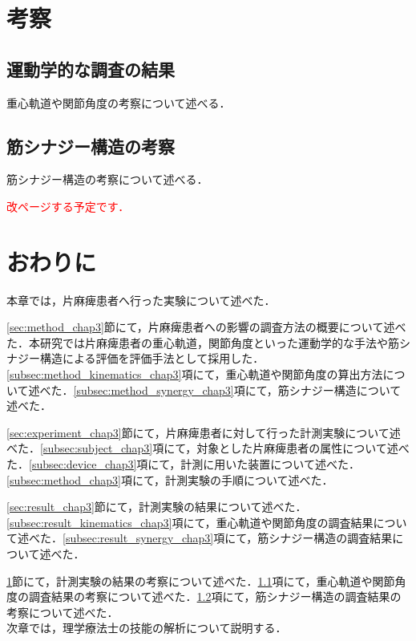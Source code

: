 \section{考察}
\label{sec:discussion_chap3}

\subsection{運動学的な調査の結果}
\label{subsec:discussion_kinematics_chap3}
重心軌道や関節角度の考察について述べる．

\subsection{筋シナジー構造の考察}
\label{subsec:discussion_synergy_chap3}
筋シナジー構造の考察について述べる．

\textcolor{red}{改ページする予定です．}
\section{おわりに}
\label{sec:outro_chap3}
本章では，片麻痺患者へ行った実験について述べた．

\ref{sec:method_chap3}節にて，片麻痺患者への影響の調査方法の概要について述べた．本研究では片麻痺患者の重心軌道，関節角度といった運動学的な手法や筋シナジー構造による評価を評価手法として採用した．\ref{subsec:method_kinematics_chap3}項にて，重心軌道や関節角度の算出方法について述べた．\ref{subsec:method_synergy_chap3}項にて，筋シナジー構造について述べた．

\ref{sec:experiment_chap3}節にて，片麻痺患者に対して行った計測実験について述べた．\ref{subsec:subject_chap3}項にて，対象とした片麻痺患者の属性について述べた．\ref{subsec:device_chap3}項にて，計測に用いた装置について述べた．\ref{subsec:method_chap3}項にて，計測実験の手順について述べた．

\ref{sec:result_chap3}節にて，計測実験の結果について述べた．\ref{subsec:result_kinematics_chap3}項にて，重心軌道や関節角度の調査結果について述べた．\ref{subsec:result_synergy_chap3}項にて，筋シナジー構造の調査結果について述べた．

\ref{sec:discussion_chap3}節にて，計測実験の結果の考察について述べた．\ref{subsec:discussion_kinematics_chap3}項にて，重心軌道や関節角度の調査結果の考察について述べた．\ref{subsec:discussion_synergy_chap3}項にて，筋シナジー構造の調査結果の考察について述べた．\\

次章では，理学療法士の技能の解析について説明する．

\clearpage

